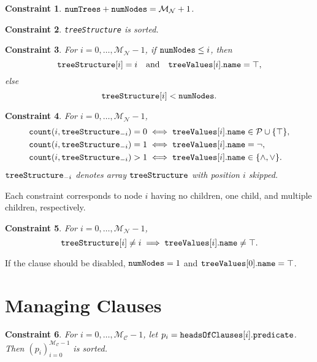 \documentclass[runningheads]{llncs}
\newtheorem{constraint}{Constraint}
\newcommand{\variable}[1]{\texttt{\textup{#1}}}
\newcommand{\predicates}{\mathcal{P}}
\newcommand{\maxNumNodes}{\mathcal{M}_{\mathcal{N}}}
\newcommand{\maxNumClauses}{\mathcal{M}_{\mathcal{C}}}
\begin{document}
\begin{constraint}
  $\variable{numTrees} + \variable{numNodes} = \maxNumNodes{} + 1$.
\end{constraint}

\begin{constraint}
  \variable{treeStructure} is sorted.
\end{constraint}

\begin{constraint}
  For $i = 0, \dots, \maxNumNodes{} - 1$, if $\variable{numNodes} \le
  i$, then
  \[
    \variable{treeStructure}[i] = i \quad \text{and} \quad
    \variable{treeValues}[i].\variable{name} = \top,
  \]
  else
  \[
    \variable{treeStructure}[i] < \variable{numNodes}.
  \]
\end{constraint}

\begin{constraint}
  For $i = 0, \dots, \maxNumNodes{} - 1$,
  \begin{align*}
    \variable{count}(i, \variable{treeStructure}_{-i}) = 0 &\iff \variable{treeValues}[i].\variable{name} \in \predicates{} \cup \{ \top \},\\
    \variable{count}(i, \variable{treeStructure}_{-i}) = 1 &\iff \variable{treeValues}[i].\variable{name} = \neg,\\
    \variable{count}(i, \variable{treeStructure}_{-i}) > 1 &\iff \variable{treeValues}[i].\variable{name} \in \{ \land, \lor \}.
  \end{align*}
  $\variable{treeStructure}_{-i}$ denotes array $\variable{treeStructure}$ with
  position $i$ skipped.
\end{constraint}
Each constraint corresponds to node $i$ having no children, one child, and
multiple children, respectively.


\begin{constraint}
  For $i = 0, \dots, \maxNumNodes{} - 1$,
  \[
    \variable{treeStructure}[i] \ne i \implies
    \variable{treeValues}[i].\variable{name} \ne \top.
  \]
\end{constraint}

If the clause should be disabled, $\variable{numNodes} = 1$ and
$\variable{treeValues}[0].\variable{name} = \top$.

\section{Managing Clauses}

\begin{constraint}
  For $i = 0, \dots, \maxNumClauses - 1$, let $p_i =
  \variable{headsOfClauses}[i].\variable{predicate}$. Then
  $(p_i)_{i=0}^{\maxNumClauses - 1}$ is sorted.
\end{constraint}
\end{document}
